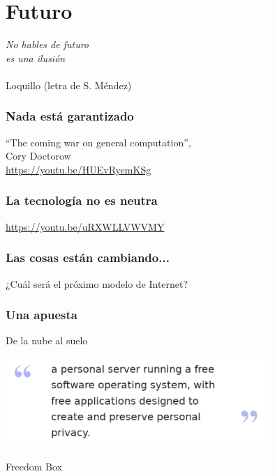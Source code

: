 
\section{Futuro}

\begin{flushright}
{\em
  No hables de futuro \\
  es una ilusión \\
}
~ \\
Loquillo (letra de S. Méndez) \\
\end{flushright}

\begin{frame}[fragile]
  \frametitle{Nada está garantizado}

  ``The coming war on general computation'', \\
  Cory Doctorow \\

  \url{https://youtu.be/HUEvRyemKSg}
\end{frame}

\begin{frame}[fragile]
  \frametitle{La tecnología no es neutra}


  \url{https://youtu.be/uRXWLLVWVMY}
\end{frame}


\begin{frame}[fragile]
  \frametitle{Las cosas están cambiando...}


  ¿Cuál será el próximo modelo de Internet?
  
\end{frame}

\begin{frame}[fragile]
  \frametitle{Una apuesta}

  De la nube al suelo

  \begin{center}
  \includegraphics[width=10cm]{figs/freedom-box}
  \end{center}

  Freedom Box
  
\end{frame}
  

